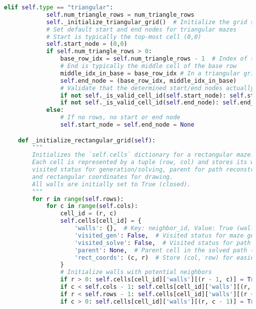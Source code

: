 \documentclass[UTF8]{report}
\theoremstyle{MyLineTheoremStyle} %
\theoremstyle{MyBlockTheoremStyle} %
\theoremstyle{MySubsubsectionStyle} %
\begin{document}
\begin{lstlisting}[language=Python, caption={迷宫生成与求解程序代码}]
        elif self.type == "triangular":
            self.num_triangle_rows = num_triangle_rows
            self._initialize_triangular_grid()  # Initialize the grid structure for a triangular maze
            # Set default start and end nodes for triangular mazes
            # Start is typically the top-most cell (0,0)
            self.start_node = (0,0) 
            if self.num_triangle_rows > 0:
                base_row_idx = self.num_triangle_rows - 1  # Index of the last row
                # End is typically the middle cell of the base row
                middle_idx_in_base = base_row_idx # In a triangular grid, the middle cell index in a row 'r' is 'r'
                self.end_node = (base_row_idx, middle_idx_in_base)
                # Validate that the determined start/end nodes actually exist in the generated cells
                if not self._is_valid_cell_id(self.start_node): self.start_node = None
                if not self._is_valid_cell_id(self.end_node): self.end_node = None
            else:
                # If no rows, no start or end node
                self.start_node = self.end_node = None

    def _initialize_rectangular_grid(self):
        """
        Initializes the `self.cells` dictionary for a rectangular maze.
        Each cell is represented by a tuple (row, col) and stores its walls,
        visited status for generation/solving, parent for path reconstruction,
        and rectangular coordinates for drawing.
        All walls are initially set to True (closed).
        """
        for r in range(self.rows):
            for c in range(self.cols):
                cell_id = (r, c)
                self.cells[cell_id] = {
                    'walls': {},  # Key: neighbor_id, Value: True (wall exists) or False (no wall)
                    'visited_gen': False,  # Visited status for maze generation algorithm
                    'visited_solve': False,  # Visited status for path solving algorithm
                    'parent': None,  # Parent cell in the solved path (for BFS/DFS reconstruction)
                    'rect_coords': (c, r)  # Store (col, row) for easier access in drawing
                }
                # Initialize walls with potential neighbors
                if r > 0: self.cells[cell_id]['walls'][(r - 1, c)] = True  # Wall to the North
                if c < self.cols - 1: self.cells[cell_id]['walls'][(r, c + 1)] = True  # Wall to the East
                if r < self.rows - 1: self.cells[cell_id]['walls'][(r + 1, c)] = True  # Wall to the South
                if c > 0: self.cells[cell_id]['walls'][(r, c - 1)] = True  # Wall to the West


\end{lstlisting}
\end{document}
